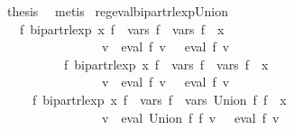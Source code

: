 \begin{isabellebody}
\ {\isacharquery}{\kern0pt}thesis\ \isamarkupfalse%
\ metis\isanewline
{}\isamarkupfalse%
%
\endisatagproof
{\isafoldproof}%
%
\isadelimproof
\isanewline
%
\endisadelimproof
\isanewline
{}\isamarkupfalse%
\ reg{\isacharunderscore}{\kern0pt}eval{\isacharunderscore}{\kern0pt}bipart{\isacharunderscore}{\kern0pt}rlexp{\isacharunderscore}{\kern0pt}Union{\isacharcolon}{\kern0pt}\isanewline
\ \ \ {\isachardoublequoteopen}{\isasymexists}f{\isacharprime}{\kern0pt}{\isachardot}{\kern0pt}\ bipart{\isacharunderscore}{\kern0pt}rlexp\ x\ f{\isacharprime}{\kern0pt}\ {\isasymand}\ vars\ f{\isacharprime}{\kern0pt}\ {\isacharequal}{\kern0pt}\ vars\ f{}\ {\isasymunion}\ {\isacharbraceleft}{\kern0pt}x{\isacharbraceright}{\kern0pt}\ {\isasymand}\isanewline
\ \ \ \ \ \ \ \ \ \ \ \ \ \ \ \ {\isacharparenleft}{\kern0pt}{\isasymforall}v{\isachardot}{\kern0pt}\ {\isasymPsi}\ {\isacharparenleft}{\kern0pt}eval\ f{}\ v{\isacharparenright}{\kern0pt}\ {\isacharequal}{\kern0pt}\ {\isasymPsi}\ {\isacharparenleft}{\kern0pt}eval\ f{\isacharprime}{\kern0pt}\ v{\isacharparenright}{\kern0pt}{\isacharparenright}{\kern0pt}{\isachardoublequoteclose}\isanewline
\ \ \ \ \ \ \ \ \ \ {\isachardoublequoteopen}{\isasymexists}f{\isacharprime}{\kern0pt}{\isachardot}{\kern0pt}\ bipart{\isacharunderscore}{\kern0pt}rlexp\ x\ f{\isacharprime}{\kern0pt}\ {\isasymand}\ vars\ f{\isacharprime}{\kern0pt}\ {\isacharequal}{\kern0pt}\ vars\ f{}\ {\isasymunion}\ {\isacharbraceleft}{\kern0pt}x{\isacharbraceright}{\kern0pt}\ {\isasymand}\isanewline
\ \ \ \ \ \ \ \ \ \ \ \ \ \ \ \ {\isacharparenleft}{\kern0pt}{\isasymforall}v{\isachardot}{\kern0pt}\ {\isasymPsi}\ {\isacharparenleft}{\kern0pt}eval\ f{}\ v{\isacharparenright}{\kern0pt}\ {\isacharequal}{\kern0pt}\ {\isasymPsi}\ {\isacharparenleft}{\kern0pt}eval\ f{\isacharprime}{\kern0pt}\ v{\isacharparenright}{\kern0pt}{\isacharparenright}{\kern0pt}{\isachardoublequoteclose}\isanewline
\ \ \ \ \ {\isachardoublequoteopen}{\isasymexists}f{\isacharprime}{\kern0pt}{\isachardot}{\kern0pt}\ bipart{\isacharunderscore}{\kern0pt}rlexp\ x\ f{\isacharprime}{\kern0pt}\ {\isasymand}\ vars\ f{\isacharprime}{\kern0pt}\ {\isacharequal}{\kern0pt}\ vars\ {\isacharparenleft}{\kern0pt}Union\ f{}\ f{}{\isacharparenright}{\kern0pt}\ {\isasymunion}\ {\isacharbraceleft}{\kern0pt}x{\isacharbraceright}{\kern0pt}\ {\isasymand}\isanewline
\ \ \ \ \ \ \ \ \ \ \ \ \ \ \ \ {\isacharparenleft}{\kern0pt}{\isasymforall}v{\isachardot}{\kern0pt}\ {\isasymPsi}\ {\isacharparenleft}{\kern0pt}eval\ {\isacharparenleft}{\kern0pt}Union\ f{}\ f{}{\isacharparenright}{\kern0pt}\ v{\isacharparenright}{\kern0pt}\ {\isacharequal}{\kern0pt}\ {\isasymPsi}\ {\isacharparenleft}{\kern0pt}eval\ f{\isacharprime}{\kern0pt}\ v{\isacharparenright}{\kern0pt}{\isacharparenright}{\kern0pt}{\isachardoublequoteclose}\isanewline

\end{isabellebody}
